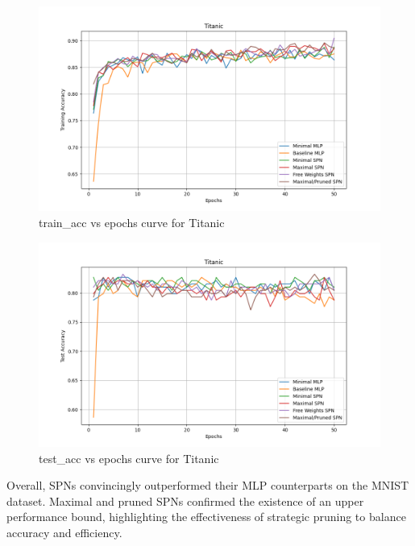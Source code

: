 \begin{figure}[H]
    \centering
    \includegraphics[width=\linewidth]{Figures/Results/Titanic/training_accuracy_plot.png} %
    \captionsetup{width=\linewidth}
    \caption{train\_acc vs epochs curve for Titanic}
    \label{fig:titanicTrainCurve}
\end{figure}

\begin{figure}[H]
    \centering
    \includegraphics[width=\linewidth]{Figures/Results/Titanic/test_accuracy_plot.png} %
    \captionsetup{width=\linewidth}
    \caption{test\_acc vs epochs curve for Titanic}
    \label{fig:titanicTestCurve}
\end{figure}

Overall, SPNs convincingly outperformed their MLP counterparts on the MNIST dataset. Maximal and pruned SPNs confirmed the existence of an upper performance bound, highlighting the effectiveness of strategic pruning to balance accuracy and efficiency.

